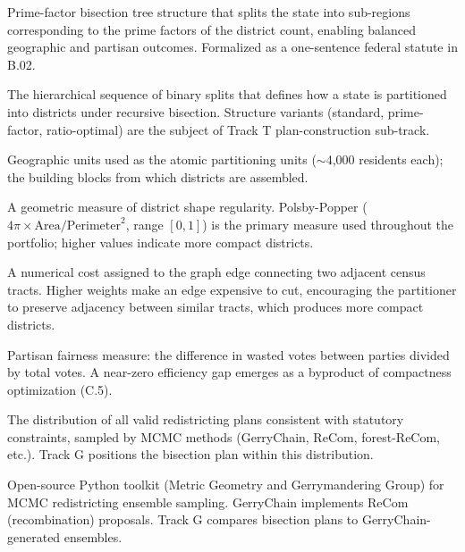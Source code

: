 \documentclass[12pt]{article}
\begin{document}
\begin{description}[leftmargin=2.2cm,style=nextline,noitemsep,topsep=4pt]
    \item[ApportionRegions] Prime-factor bisection tree structure that splits
        the state into sub-regions corresponding to the prime factors of the
        district count, enabling balanced geographic and partisan outcomes.
        Formalized as a one-sentence federal statute in B.02.

    \item[Bisection tree] The hierarchical sequence of binary splits that
        defines how a state is partitioned into districts under recursive
        bisection. Structure variants (standard, prime-factor, ratio-optimal)
        are the subject of Track T plan-construction sub-track.

    \item[Census tracts] Geographic units used as the atomic partitioning
        units ($\sim$4,000 residents each); the building blocks from which
        districts are assembled.

    \item[Compactness] A geometric measure of district shape regularity.
        Polsby-Popper ($4\pi \times \text{Area} / \text{Perimeter}^2$, range
        $[0,1]$) is the primary measure used throughout the portfolio;
        higher values indicate more compact districts.

    \item[Edge-weight] A numerical cost assigned to the graph edge connecting
        two adjacent census tracts. Higher weights make an edge expensive to
        cut, encouraging the partitioner to preserve adjacency between similar
        tracts, which produces more compact districts.

    \item[Efficiency gap] Partisan fairness measure: the difference in wasted
        votes between parties divided by total votes. A near-zero efficiency
        gap emerges as a byproduct of compactness optimization (C.5).

    \item[Ensemble] The distribution of all valid redistricting plans
        consistent with statutory constraints, sampled by MCMC methods
        (GerryChain, ReCom, forest-ReCom, etc.). Track G positions the
        bisection plan within this distribution.

    \item[GerryChain / ReCom] Open-source Python toolkit (Metric Geometry and
        Gerrymandering Group) for MCMC redistricting ensemble sampling.
        GerryChain implements ReCom (recombination) proposals. Track G
        compares bisection plans to GerryChain-generated ensembles.


\end{description}
\end{document}
